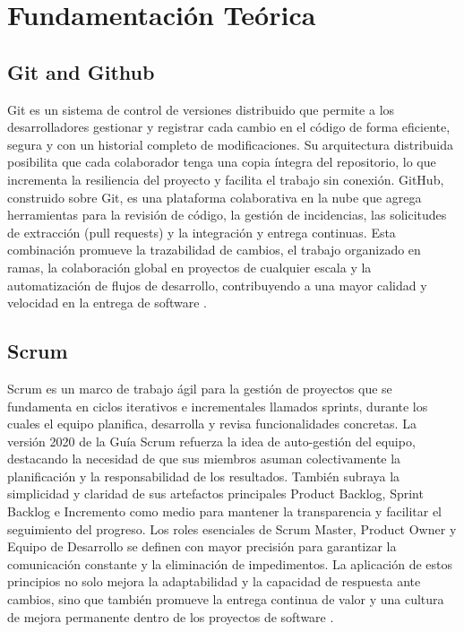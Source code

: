 \section{Fundamentación Teórica}
\subsection{Git and Github}
Git es un sistema de control de versiones distribuido que permite a los desarrolladores gestionar y registrar cada cambio en el código de forma eficiente, segura y con un historial completo de modificaciones. Su arquitectura distribuida posibilita que cada colaborador tenga una copia íntegra del repositorio, lo que incrementa la resiliencia del proyecto y facilita el trabajo sin conexión. GitHub, construido sobre Git, es una plataforma colaborativa en la nube que agrega herramientas para la revisión de código, la gestión de incidencias, las solicitudes de extracción (pull requests) y la integración y entrega continuas. Esta combinación promueve la trazabilidad de cambios, el trabajo organizado en ramas, la colaboración global en proyectos de cualquier escala y la automatización de flujos de desarrollo, contribuyendo a una mayor calidad y velocidad en la entrega de software \cite{ref1}.

\subsection{Scrum}
Scrum es un marco de trabajo ágil para la gestión de proyectos que se fundamenta en ciclos iterativos e incrementales llamados sprints, durante los cuales el equipo planifica, desarrolla y revisa funcionalidades concretas. La versión 2020 de la Guía Scrum refuerza la idea de auto-gestión del equipo, destacando la necesidad de que sus miembros asuman colectivamente la planificación y la responsabilidad de los resultados. También subraya la simplicidad y claridad de sus artefactos principales Product Backlog, Sprint Backlog e Incremento como medio para mantener la transparencia y facilitar el seguimiento del progreso. Los roles esenciales de Scrum Master, Product Owner y Equipo de Desarrollo se definen con mayor precisión para garantizar la comunicación constante y la eliminación de impedimentos. La aplicación de estos principios no solo mejora la adaptabilidad y la capacidad de respuesta ante cambios, sino que también promueve la entrega continua de valor y una cultura de mejora permanente dentro de los proyectos de software \cite{ref2}.

